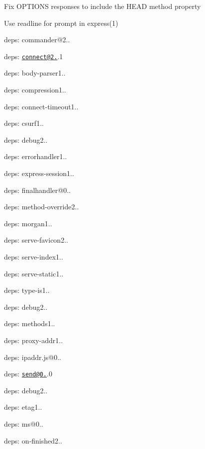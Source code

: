 {\ttfamily }

{\ttfamily 
\begin{DoxyItemize}
\item Fix {\ttfamily O\+P\+T\+I\+O\+NS} responses to include the {\ttfamily H\+E\+AD} method property
\item Use {\ttfamily readline} for prompt in {\ttfamily express(1)}
\item deps\+: commander@2..
\item deps\+: \href{mailto:connect@2.28}{\tt connect@2.}.1
\begin{DoxyItemize}
\item deps\+: body-\/parser1..
\item deps\+: compression1..
\item deps\+: connect-\/timeout1..
\item deps\+: csurf1..
\item deps\+: debug2..
\item deps\+: errorhandler1..
\item deps\+: express-\/session1..
\item deps\+: finalhandler@0..
\item deps\+: method-\/override2..
\item deps\+: morgan1..
\item deps\+: serve-\/favicon2..
\item deps\+: serve-\/index1..
\item deps\+: serve-\/static1..
\item deps\+: type-\/is1..
\end{DoxyItemize}
\item deps\+: debug2..
\item deps\+: methods1..
\item deps\+: proxy-\/addr1..
\begin{DoxyItemize}
\item deps\+: ipaddr.\+js@0..
\end{DoxyItemize}
\item deps\+: \href{mailto:send@0.11}{\tt send@0.}.0
\begin{DoxyItemize}
\item deps\+: debug2..
\item deps\+: etag1..
\item deps\+: ms@0..
\item deps\+: on-\/finished2..
\end{DoxyItemize}
\end{DoxyItemize}}

